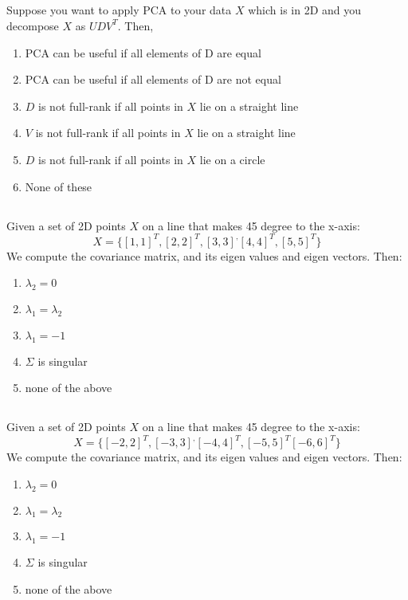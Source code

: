 \begin{frame}
\section{}
Suppose you want to apply PCA to your data $X$
which is in 2D and you decompose $X$ as $UDV^T$. Then,
\begin{enumerate}
\item PCA can be useful if all elements of D are equal
\item PCA can be useful if all elements of D are not equal    %
\item   $D$ is not full-rank if all points in $X$ lie on a straight line    %
\item   $V$ is not full-rank if all points in $X$ lie on a straight line
\item   $D$ is not full-rank if all points in $X$ lie on a circle
\item None of these
\end{enumerate}
\end{frame}

\begin{frame}
\section{}
Given a set of 2D points $X$ on a line that makes 45 degree to the x-axis:
\[ X = \{ [1,1]^T, [2,2]^T, [3,3]^, [4,4]^T, [5,5]^T \}\]
We compute the covariance matrix, and its eigen values and eigen vectors. Then:

\begin{enumerate}
\item  $\lambda_2 = 0$    %
\item  $\lambda_1 = \lambda_2$
\item  $\lambda_1 = -1$
\item  $\Sigma$ is singular   %
\item none of the above
\end{enumerate}
\end{frame}

\begin{frame}
\section{}
Given a set of 2D points $X$ on a line that makes 45 degree to the x-axis:
\[ X = \{  [-2,2]^T, [-3,3]^, [-4,4]^T, [-5,5]^T [-6,6]^T \}\]
We compute the covariance matrix, and its eigen values and eigen vectors. Then:

\begin{enumerate}
\item  $\lambda_2 = 0$    %
\item  $\lambda_1 = \lambda_2$
\item  $\lambda_1 = -1$
\item  $\Sigma$ is singular   %
\item none of the above
\end{enumerate}
\end{frame}

